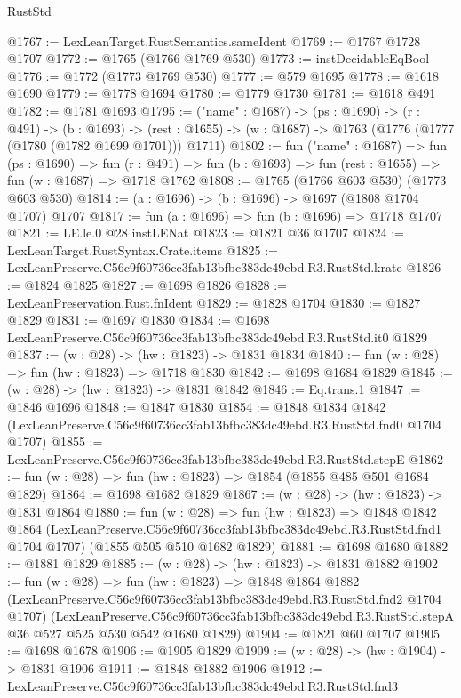 \begin{lexlean}{RustStd}
\begin{coremodule}
@1767 := LexLeanTarget.RustSemantics.sameIdent
@1769 := @1767 @1728 @1707
@1772 := @1765 (@1766 @1769 @530)
@1773 := instDecidableEqBool
@1776 := @1772 (@1773 @1769 @530)
@1777 := @579 @1695
@1778 := @1618 @1690
@1779 := @1778 @1694
@1780 := @1779 @1730
@1781 := @1618 @491
@1782 := @1781 @1693
@1795 := ("name" : @1687) ->
  (ps : @1690) ->
  (r : @491) ->
  (b : @1693) ->
  (rest : @1655) -> (w : @1687) -> @1763 (@1776 (@1777 (@1780 (@1782 @1699 @1701))) @1711)
@1802 := fun ("name" : @1687) =>
  fun (ps : @1690) =>
  fun (r : @491) => fun (b : @1693) => fun (rest : @1655) => fun (w : @1687) => @1718 @1762
@1808 := @1765 (@1766 @603 @530) (@1773 @603 @530)
@1814 := (a : @1696) -> (b : @1696) -> @1697 (@1808 @1704 @1707) @1707
@1817 := fun (a : @1696) => fun (b : @1696) => @1718 @1707
@1821 := LE.le.{0} @28 instLENat
@1823 := @1821 @36 @1707
@1824 := LexLeanTarget.RustSyntax.Crate.items
@1825 := LexLeanPreserve.C56c9f60736cc3fab13bfbc383dc49ebd.R3.RustStd.krate
@1826 := @1824 @1825
@1827 := @1698 @1826
@1828 := LexLeanPreservation.Rust.fnIdent
@1829 := @1828 @1704
@1830 := @1827 @1829
@1831 := @1697 @1830
@1834 := @1698 LexLeanPreserve.C56c9f60736cc3fab13bfbc383dc49ebd.R3.RustStd.it0 @1829
@1837 := (w : @28) -> (hw : @1823) -> @1831 @1834
@1840 := fun (w : @28) => fun (hw : @1823) => @1718 @1830
@1842 := @1698 @1684 @1829
@1845 := (w : @28) -> (hw : @1823) -> @1831 @1842
@1846 := Eq.trans.{1}
@1847 := @1846 @1696
@1848 := @1847 @1830
@1854 := @1848
    @1834
    @1842
    (LexLeanPreserve.C56c9f60736cc3fab13bfbc383dc49ebd.R3.RustStd.fnd0 @1704 @1707)
@1855 := LexLeanPreserve.C56c9f60736cc3fab13bfbc383dc49ebd.R3.RustStd.stepE
@1862 := fun (w : @28) => fun (hw : @1823) => @1854 (@1855 @485 @501 @1684 @1829)
@1864 := @1698 @1682 @1829
@1867 := (w : @28) -> (hw : @1823) -> @1831 @1864
@1880 := fun (w : @28) =>
  fun (hw : @1823) =>
  @1848
    @1842
    @1864
    (LexLeanPreserve.C56c9f60736cc3fab13bfbc383dc49ebd.R3.RustStd.fnd1 @1704 @1707)
    (@1855 @505 @510 @1682 @1829)
@1881 := @1698 @1680
@1882 := @1881 @1829
@1885 := (w : @28) -> (hw : @1823) -> @1831 @1882
@1902 := fun (w : @28) =>
  fun (hw : @1823) =>
  @1848
    @1864
    @1882
    (LexLeanPreserve.C56c9f60736cc3fab13bfbc383dc49ebd.R3.RustStd.fnd2 @1704 @1707)
    (LexLeanPreserve.C56c9f60736cc3fab13bfbc383dc49ebd.R3.RustStd.stepA
      @36
      @527
      @525
      @530
      @542
      @1680
      @1829)
@1904 := @1821 @60 @1707
@1905 := @1698 @1678
@1906 := @1905 @1829
@1909 := (w : @28) -> (hw : @1904) -> @1831 @1906
@1911 := @1848 @1882 @1906
@1912 := LexLeanPreserve.C56c9f60736cc3fab13bfbc383dc49ebd.R3.RustStd.fnd3

\end{coremodule}
\end{lexlean}
